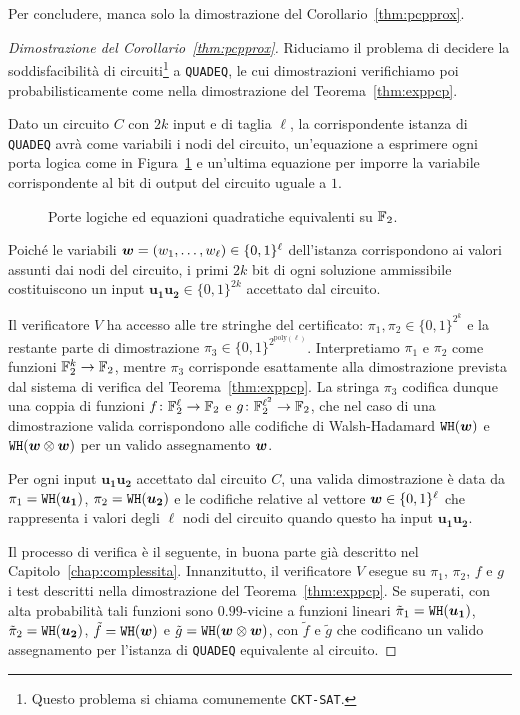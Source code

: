 Per concludere, manca solo la dimostrazione del Corollario~\ref{thm:pcpprox}.

\begin{proof}[Dimostrazione del Corollario~\ref{thm:pcpprox}]
	Riduciamo il problema di decidere la soddisfacibilità di
	circuiti\footnote{Questo problema si chiama comunemente \texttt{CKT-SAT}.}
	a \texttt{QUADEQ}, le cui dimostrazioni verifichiamo poi probabilisticamente
	come nella dimostrazione del Teorema~\ref{thm:exppcp}.

	Dato un circuito $C$ con $2 k$ input e di taglia $\ell$, la corrispondente
	istanza di \texttt{QUADEQ} avrà come variabili i nodi del circuito,
	un'equazione a esprimere ogni porta logica come in
	Figura~\ref{fig:porte-logiche-quadeq} e un'ultima equazione per imporre la
	variabile corrispondente al bit di output del circuito uguale a $1$.

	\begin{figure}[htbp]
		\centering
		
		\caption{Porte logiche ed equazioni quadratiche equivalenti su $\mathbb{F}_2$.}
		\label{fig:porte-logiche-quadeq}
	\end{figure}

	Poiché le variabili $\bm{w} = (w_1, \dots, w_\ell) \in \{0, 1\}^\ell$
	dell'istanza corrispondono ai valori assunti dai nodi del circuito, i primi
	$2 k$ bit di ogni soluzione ammissibile costituiscono un input
	$\bm{u_1 u_2} \in \{0, 1\}^{2 k}$ accettato dal circuito.

	Il verificatore $V$ ha accesso alle tre stringhe del certificato:
	$\pi_1, \pi_2 \in \{0, 1\}^{2^k}$ e la restante parte di dimostrazione
	$\pi_3 \in \{0, 1\}^{2^{\mathrm{poly}(\ell)}}$.
	Interpretiamo $\pi_1$ e $\pi_2$ come funzioni $\mathbb{F}_2^k \to \mathbb{F}_2$, mentre
	$\pi_3$ corrisponde esattamente alla dimostrazione prevista dal sistema di
	verifica del Teorema~\ref{thm:exppcp}.
	La stringa $\pi_3$ codifica dunque una coppia di funzioni
	$f\colon \mathbb{F}_2^\ell \to \mathbb{F}_2$ e $g\colon \mathbb{F}_2^{\ell^2} \to \mathbb{F}_2$, che nel caso
	di una dimostrazione valida corrispondono alle codifiche di Walsh-Hadamard
	$\mathtt{WH}(\bm{w})$ e $\mathtt{WH}(\bm{w} \otimes \bm{w})$ per un valido assegnamento $\bm{w}$.

	Per ogni input $\bm{u_1 u_2}$ accettato dal circuito $C$, una valida
	dimostrazione è data da $\pi_1 = \mathtt{WH}(\bm{u_1})$,
	$\pi_2 = \mathtt{WH}(\bm{u_2})$ e le codifiche relative al vettore
	$\bm{w} \in \{0, 1\}^\ell$ che rappresenta i valori degli $\ell$ nodi del
	circuito quando questo ha input $\bm{u_1 u_2}$.

	Il processo di verifica è il seguente, in buona parte già descritto nel
	Capitolo~\ref{chap:complessita}.
	Innanzitutto, il verificatore $V$ esegue su $\pi_1$, $\pi_2$, $f$ e $g$
	i test descritti nella dimostrazione del Teorema~\ref{thm:exppcp}.
	Se superati, con alta probabilità tali funzioni sono $0.99$-vicine a
	funzioni lineari $\tilde{\pi}_1 = \mathtt{WH}(\bm{u_1})$,
	$\tilde{\pi}_2 = \mathtt{WH}(\bm{u_2})$, $\tilde{f} = \mathtt{WH}(\bm{w})$ e
	$\tilde{g} = \mathtt{WH}(\bm{w} \otimes \bm{w})$, con $\tilde{f}$ e $\tilde{g}$ che
	codificano un valido assegnamento per l'istanza di \texttt{QUADEQ}
	equivalente al circuito.


\end{proof}
